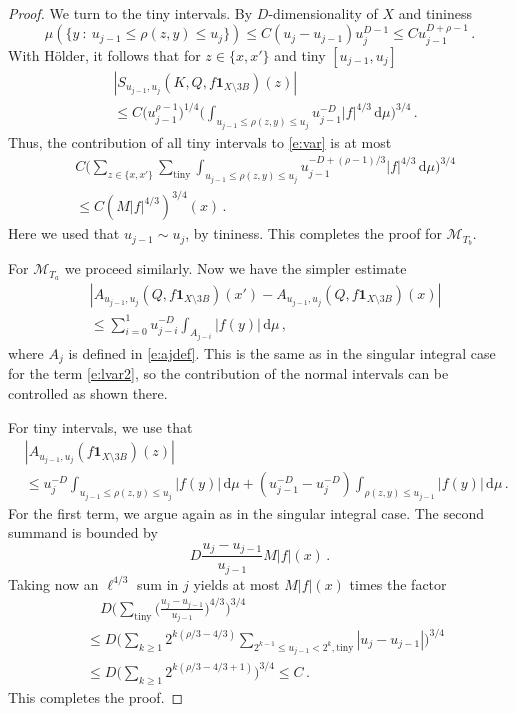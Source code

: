 \documentclass[12pt,reqno,a4paper,dvipsnames]{amsart}
\theoremstyle{plain}
\theoremstyle{definition}
\numberwithin{theorem}{section}
\numberwithin{equation}{section}
\newcommand{\AD}{D}
\begin{document}
\begin{proof}
    We turn to the tiny intervals. By $\AD$-dimensionality of $X$ and tininess
    \[
        \mu(\{y \ : \ u_{j-1} \le \rho(z, y) \le u_j\}) \le C (u_j - u_{j-1}) u_j^{\AD - 1} \le C u_{j-1}^{\AD + \rho - 1}\,.
    \]
    With Hölder, it follows that for $z \in \{x, x'\}$ and tiny $[u_{j-1}, u_j]$
    \begin{align*}
        &|S_{u_{j-1}, u_j}(K, Q, f \mathbf{1}_{X \setminus 3B})(z)|\\
        &\le C \Big(u_{j-1}^{\rho -1}\Big)^{1/4} \Big(\int_{u_{j-1} \le \rho(z, y) \le u_j} u_{j-1}^{-\AD} |f|^{4/3} \, \mathrm{d}\mu \Big)^{3/4}\,.
    \end{align*}
    Thus, the contribution of all tiny intervals to \eqref{e:var} is at most
    \begin{align*}
        &C \Big( \sum_{z \in \{x,x'\}} \sum_{\mathrm{tiny}} \int_{u_{j-1} \le \rho(z, y) \le u_j} u_{j-1}^{-\AD + (\rho - 1)/3} |f|^{4/3} \, \mathrm{d}\mu\Big)^{3/4} \\
        &\le C (M |f|^{4/3})^{3/4}(x)\,.
    \end{align*}
    Here we used that $u_{j-1} \sim u_j$, by tininess. This completes the proof for $\mathcal{M}_{T_b}$. 

    For $\mathcal{M}_{T_a}$ we proceed similarly. Now we have the simpler estimate
    \begin{align}
        &|A_{u_{j-1}, u_j}(Q, f \mathbf{1}_{X \setminus 3B})(x') - A_{u_{j-1}, u_j} (Q, f \mathbf{1}_{X \setminus 3B})(x)|\nonumber\\
        &\le \sum_{i = 0}^1 u_{j - i}^{-\AD} \int_{A_{j - i}} |f(y)| \, \mathrm{d}\mu\,,\label{e:lvar2_a}
    \end{align}
    where $A_j$ is defined in \eqref{e:ajdef}. This is the same as in the singular integral case for the term \eqref{e:lvar2}, so the contribution of the normal intervals can be controlled as shown there. 

    For tiny intervals, we use that 
    \begin{align*}
        &|A_{u_{j-1}, u_j}(f\mathbf{1}_{X \setminus 3B})(z)|\\
        &\le u_j^{-\AD} \int_{u_{j-1} \le \rho(z,y) \le  u_j} |f(y)| \, \mathrm{d}\mu + (u_{j-1}^{-\AD} - u_j^{-\AD}) \int_{\rho(z,y) \le u_{j-1}} |f(y)| \, \mathrm{d}\mu\,.
    \end{align*}
    For the first term, we argue again as in the singular integral case. The second summand is bounded by
    \[
        \AD \frac{u_j - u_{j-1}}{u_{j-1}} M|f|(x)\,.
    \]
    Taking now an $\ell^{4/3}$ sum in $j$ yields at most $M|f|(x)$ times the factor
    \begin{align*}
        &\quad \AD \Big(\sum_{\mathrm{tiny}} \Big(\frac{u_{j} - u_{j-1}}{u_{j-1}} \Big)^{4/3} \Big)^{3/4} \\
        &\le \AD \Big(\sum_{k \ge 1} 2^{k (\rho / 3 - 4/3)} \sum_{2^{k-1} \le u_{j-1} < 2^k, \mathrm{tiny}} |u_j - u_{j-1}| \Big)^{3/4}\\
        &\le \AD \Big(\sum_{k \ge 1} 2^{k (\rho / 3 - 4/3 + 1)} \Big)^{3/4}  \le C \,.
    \end{align*}
    This completes the proof.
\end{proof}
\end{document}
